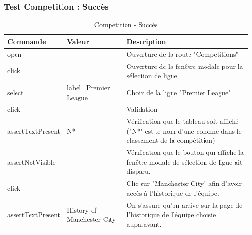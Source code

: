 \documentclass[a4paper,14pt]{extarticle}
\begin{document}
{\newpage

\subsubsection{Test Competition : Succès}

\begin{table}[htp]
    \centering
    \begin{tabular}{|m{4cm}|m{4cm}|m{6cm}|}
    \hline
    \textbf{Commande} & \textbf{Valeur}            & \textbf{Description}                                                                                          \\ \hline
    open              &                            & Ouverture de la route "Competitions"                                                                          \\ \hline
    click             &                            & Ouverture de la fenêtre modale pour la sélection de ligue                                                     \\ \hline
    select            & label=Premier League       & Choix de la ligue "Premier League"                                                                            \\ \hline
    click             &                            & Validation                                                                                                    \\ \hline
    assertTextPresent & N*                         & Vérification que le tableau soit affiché ("N*" est le nom d'une colonne dans le classement de la compétition) \\ \hline
    assertNotVisible  &                            & Vérification que le bouton qui affiche la fenêtre modale de sélection de ligue ait disparu.                   \\ \hline
    click             &                            & Clic sur "Manchester City" afin d'avoir accès à l'historique de l'équipe.                                     \\ \hline
    assertTextPresent & History of Manchester City & On s'assure qu'on arrive sur la page de l'historique de l'équipe choisie auparavant.                          \\ \hline
    \end{tabular}
    \label{tab:CompSucces}
    \caption{Competition - Succès}
\end{table}

\newpage

}
\end{document}

